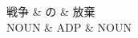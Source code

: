 \documentclass[tikz,border=5pt]{standalone}
\begin{document}
\normalsize
\begin{dependency}[edge unit distance=12.0pt]
    \begin{deptext}[column sep=1em]
        戦争 \& の \& 放棄\\
        NOUN \& ADP \& NOUN\\
    \end{deptext}
\end{dependency}
\end{document}
